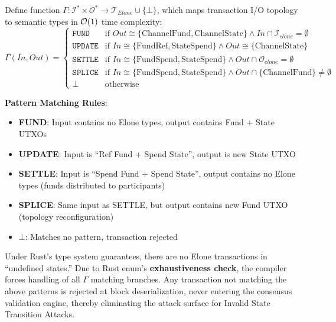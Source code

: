 \begin{definition}
Define function $\Gamma: \mathcal{I}^* \times \mathcal{O}^* \to \mathcal{T}_{Elone} \cup \{\bot\}$, which maps transaction I/O topology to semantic types in $\mathcal{O}(1)$ time complexity:
$$
\Gamma(In, Out) = \begin{cases} 
  \texttt{FUND} & \text{if } Out \cong \{\text{ChannelFund}, \text{ChannelState}\} \land In \cap \mathcal{I}_{elone} = \emptyset \\ 
  \texttt{UPDATE} & \text{if } In \cong \{\text{FundRef}, \text{StateSpend}\} \land Out \cong \{\text{ChannelState}\} \\ 
  \texttt{SETTLE} & \text{if } In \cong \{\text{FundSpend}, \text{StateSpend}\} \land Out \cap \mathcal{O}_{elone} = \emptyset \\ 
  \texttt{SPLICE} & \text{if } In \cong \{\text{FundSpend}, \text{StateSpend}\} \land Out \cap \{\text{ChannelFund}\} \neq \emptyset \\
  \bot & \text{otherwise}
\end{cases}
$$
\end{definition}

\textbf{Pattern Matching Rules}:
\begin{itemize}
    \item \textbf{FUND}: Input contains no Elone types, output contains Fund + State UTXOs
    \item \textbf{UPDATE}: Input is ``Ref Fund + Spend State'', output is new State UTXO
    \item \textbf{SETTLE}: Input is ``Spend Fund + Spend State'', output contains no Elone types (funds distributed to participants)
    \item \textbf{SPLICE}: Same input as SETTLE, but output contains new Fund UTXO (topology reconfiguration)
    \item \textbf{$\bot$}: Matches no pattern, transaction rejected
\end{itemize}

\begin{theorem}
Under Rust's type system guarantees, there are no Elone transactions in ``undefined states.'' Due to Rust enum's \textbf{exhaustiveness check}, the compiler forces handling of all $\Gamma$ matching branches. Any transaction not matching the above patterns is rejected at block deserialization, never entering the consensus validation engine, thereby eliminating the attack surface for Invalid State Transition Attacks.
\end{theorem}

